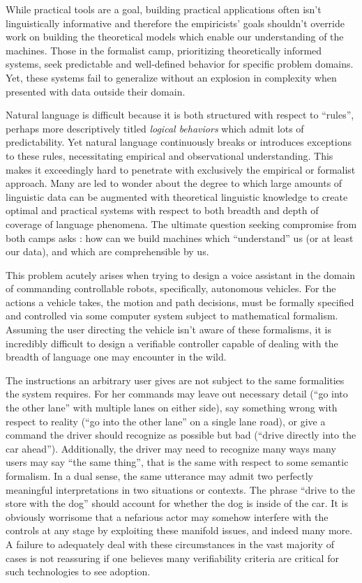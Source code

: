 \documentclass[a4paper, 11pt]{article}
\begin{document}
While practical tools are a goal, building practical applications often isn't
linguistically informative and therefore the empiricists' goals shouldn't
override work on building the theoretical models which enable our understanding
of the machines. Those in the formalist camp, prioritizing theoretically
informed systems, seek predictable and well-defined behavior for specific
problem domains. Yet, these systems fail to generalize without an explosion in
complexity when presented with data outside their domain.

Natural language is difficult because it is both structured with respect to
``rules'', perhaps more descriptively titled \emph{logical behaviors} which
admit lots of predictability. Yet natural language continuously breaks or
introduces exceptions to these rules, necessitating empirical and observational
understanding. This makes it exceedingly hard to penetrate with exclusively the
empirical or formalist approach. Many are led to wonder about the degree to
which large amounts of linguistic data can be augmented with theoretical
linguistic knowledge to create optimal and practical systems with respect to
both breadth and depth of coverage of language phenomena. The ultimate question
seeking compromise from both camps asks : how can we build machines which
``understand'' us (or at least our data), and which are comprehensible by us.

This problem acutely arises when trying to design a voice assistant in the
domain of commanding controllable robots, specifically, autonomous vehicles. For
the actions a vehicle takes, the motion and path decisions, must be formally
specified and controlled via some computer system subject to mathematical
formalism. Assuming the user directing the vehicle isn't aware of these
formalisms, it is incredibly difficult to design a verifiable controller capable
of dealing with the breadth of language one may encounter in the wild.

The instructions an arbitrary user gives are not subject to the same formalities
the system requires. For her commands may leave out necessary detail (``go into
the other lane'' with multiple lanes on either side), say something wrong with
respect to reality (``go into the other lane'' on a single lane road), or give a
command the driver should recognize as possible but bad (``drive directly
into the car ahead''). Additionally, the driver may need to recognize many
ways many users may say ``the same thing'', that is the same with respect to
some semantic formalism. In a dual sense, the same utterance may admit two
perfectly meaningful interpretations in two situations or contexts. The phrase
``drive to the store with the dog'' should account for whether the dog is inside
of the car. It is obviously worrisome that a nefarious actor may somehow
interfere with the controls at any stage by exploiting these manifold issues,
and indeed many more. A failure to adequately deal with these circumstances in the
vast majority of cases is not reassuring if one believes many verifiability
criteria are critical for such technologies to see adoption.
\end{document}
